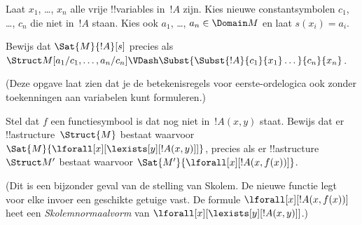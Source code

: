 \documentclass[openany]{memoir}
\begin{document}
\begin{prob}
\begin{enumerate}
\end{enumerate}
Laat $x_1$, \dots, $x_n$ alle vrije !!{variable}s in~$!A$ zijn.
Kies nieuwe constantsymbolen $c_1$, \dots, $c_n$ die niet in~$!A$
staan. Kies ook $a_1$, \dots, $a_n \in \Domain M$ en laat
$s(x_i) = a_i$.

Bewijs dat $\Sat{M}{!A}[s]$ precies als
$\Struct M[a_1/c_1,\dots,a_n/c_n]
\VDash \Subst{\Subst{!A}{c_1}{x_1}\dots}{c_n}{x_n}$.

(Deze opgave laat zien dat je de betekenisregels voor eerste-ordelogica
ook zonder toekenningen aan variabelen kunt formuleren.)
\end{prob}

\begin{prob}
Stel dat $f$ een functiesymbool is dat nog niet in~$!A(x,y)$ staat.
Bewijs dat er !!a{structure}~$\Struct{M}$ bestaat waarvoor
$\Sat{M}{\lforall[x][\lexists[y][!A(x,y)]]}$, precies als er
!!a{structure}~$\Struct M'$ bestaat waarvoor
$\Sat{M'}{\lforall[x][!A(x,f(x))]}$.

(Dit is een bijzonder geval van de stelling van Skolem. De nieuwe
functie legt voor elke invoer een geschikte getuige vast. De formule
$\lforall[x][!A(x,f(x))]$ heet een
\emph{Skolemnormaalvorm} van
$\lforall[x][\lexists[y][!A(x,y)]]$.)
\end{prob}
\endgroup

\begingroup
\def\olfilename{OLP-0165}
\def\olfilepath{content/first-order-logic/syntax-and-semantics/}
\hypertarget{unit-OLP-0165}{}




\end{document}
